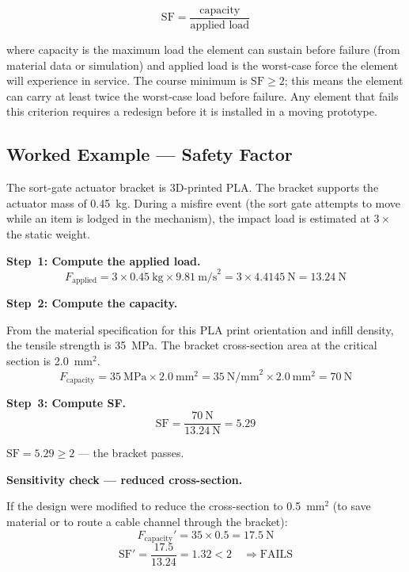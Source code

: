 \begin{equation}\label{eq:ch9-sf}
  \mathrm{SF} = \frac{\text{capacity}}{\text{applied load}}
\end{equation}

where capacity is the maximum load the element can sustain before failure (from
material data or simulation) and applied load is the worst-case force the element
will experience in service.
The course minimum is $\mathrm{SF} \geq 2$; this means the element can carry at
least twice the worst-case load before failure.
Any element that fails this criterion requires a redesign before it is installed
in a moving prototype.

\subsection{Worked Example --- Safety Factor}
\label{sec:ch9-sf-worked}

The sort-gate actuator bracket is 3D-printed PLA.
The bracket supports the actuator mass of 0.45~kg.
During a misfire event (the sort gate attempts to move while an item is lodged
in the mechanism), the impact load is estimated at $3\times$ the static weight.

\textbf{Step~1: Compute the applied load.}
\[
  F_{\text{applied}} = 3 \times 0.45~\text{kg} \times 9.81~\text{m/s}^2
                     = 3 \times 4.4145~\text{N} = 13.24~\text{N}
\]

\textbf{Step~2: Compute the capacity.}

From the material specification for this PLA print orientation and infill density,
the tensile strength is 35~MPa.
The bracket cross-section area at the critical section is 2.0~mm$^2$.
\[
  F_{\text{capacity}} = 35~\text{MPa} \times 2.0~\text{mm}^2
                      = 35~\text{N/mm}^2 \times 2.0~\text{mm}^2
                      = 70~\text{N}
\]

\textbf{Step~3: Compute SF.}
\[
  \mathrm{SF} = \frac{70~\text{N}}{13.24~\text{N}} = 5.29
\]

$\mathrm{SF} = 5.29 \geq 2$ --- the bracket passes.

\textbf{Sensitivity check --- reduced cross-section.}

If the design were modified to reduce the cross-section to 0.5~mm$^2$ (to save
material or to route a cable channel through the bracket):
\[
  F_{\text{capacity}}' = 35 \times 0.5 = 17.5~\text{N}
\]
\[
  \mathrm{SF}' = \frac{17.5}{13.24} = 1.32 < 2 \quad \Rightarrow \text{FAILS}
\]

